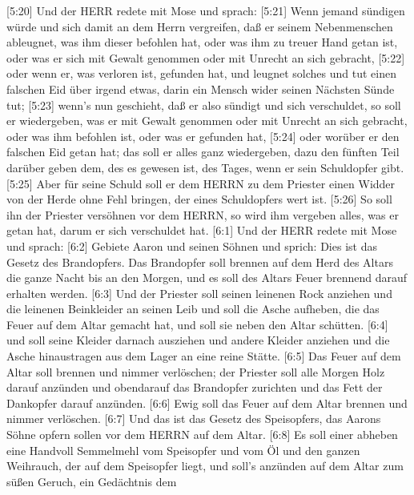  {[}5:20{]} Und der HERR redete mit Mose und sprach:
 {[}5:21{]} Wenn jemand sündigen würde und sich damit an dem
Herrn vergreifen, daß er seinem Nebenmenschen ableugnet, was ihm dieser
befohlen hat, oder was ihm zu treuer Hand getan ist, oder was er sich
mit Gewalt genommen oder mit Unrecht an sich gebracht, 
{[}5:22{]} oder wenn er, was verloren ist, gefunden hat, und leugnet
solches und tut einen falschen Eid über irgend etwas, darin ein Mensch
wider seinen Nächsten Sünde tut;  {[}5:23{]} wenn's nun
geschieht, daß er also sündigt und sich verschuldet, so soll er
wiedergeben, was er mit Gewalt genommen oder mit Unrecht an sich
gebracht, oder was ihm befohlen ist, oder was er gefunden hat,
 {[}5:24{]} oder worüber er den falschen Eid getan hat; das
soll er alles ganz wiedergeben, dazu den fünften Teil darüber geben dem,
des es gewesen ist, des Tages, wenn er sein Schuldopfer gibt.
 {[}5:25{]} Aber für seine Schuld soll er dem HERRN zu dem
Priester einen Widder von der Herde ohne Fehl bringen, der eines
Schuldopfers wert ist.  {[}5:26{]} So soll ihn der Priester
versöhnen vor dem HERRN, so wird ihm vergeben alles, was er getan hat,
darum er sich verschuldet hat.  {[}6:1{]} Und der HERR
redete mit Mose und sprach:  {[}6:2{]} Gebiete Aaron und
seinen Söhnen und sprich: Dies ist das Gesetz des Brandopfers. Das
Brandopfer soll brennen auf dem Herd des Altars die ganze Nacht bis an
den Morgen, und es soll des Altars Feuer brennend darauf erhalten
werden.  {[}6:3{]} Und der Priester soll seinen leinenen
Rock anziehen und die leinenen Beinkleider an seinen Leib und soll die
Asche aufheben, die das Feuer auf dem Altar gemacht hat, und soll sie
neben den Altar schütten.  {[}6:4{]} und soll seine Kleider
darnach ausziehen und andere Kleider anziehen und die Asche hinaustragen
aus dem Lager an eine reine Stätte.  {[}6:5{]} Das Feuer
auf dem Altar soll brennen und nimmer verlöschen; der Priester soll alle
Morgen Holz darauf anzünden und obendarauf das Brandopfer zurichten und
das Fett der Dankopfer darauf anzünden.  {[}6:6{]} Ewig
soll das Feuer auf dem Altar brennen und nimmer verlöschen.
 {[}6:7{]} Und das ist das Gesetz des Speisopfers, das
Aarons Söhne opfern sollen vor dem HERRN auf dem Altar. 
{[}6:8{]} Es soll einer abheben eine Handvoll Semmelmehl vom Speisopfer
und vom Öl und den ganzen Weihrauch, der auf dem Speisopfer liegt, und
soll's anzünden auf dem Altar zum süßen Geruch, ein Gedächtnis dem

